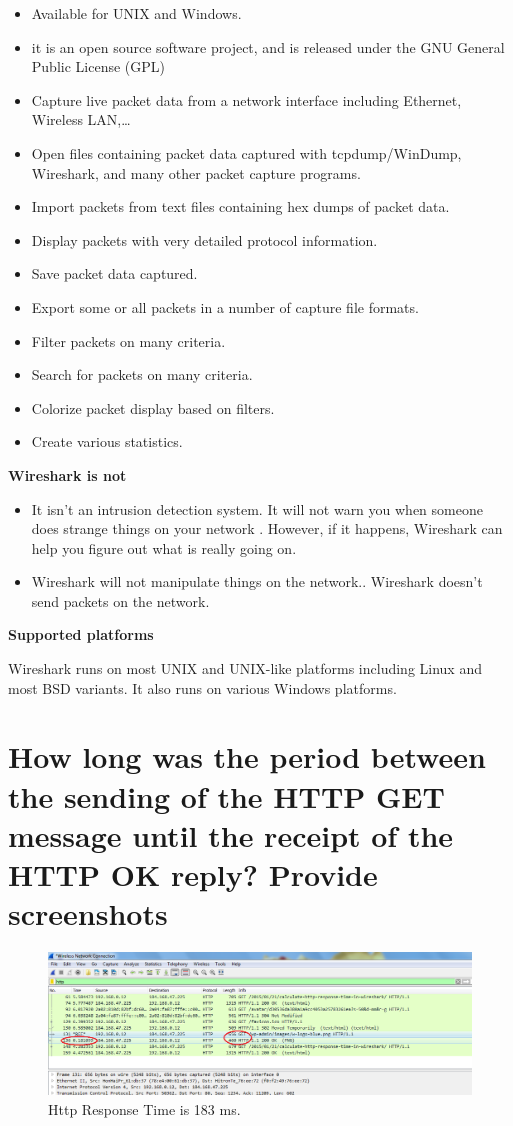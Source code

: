 \begin{itemize}
\item Available for UNIX and Windows.
\item it is an open source software project, and is released under the GNU General Public License (GPL)
\item Capture live packet data from a network interface including Ethernet, Wireless LAN,…
\item Open files containing packet data captured with tcpdump/WinDump, Wireshark, and many other packet capture programs.
\item Import packets from text files containing hex dumps of packet data.
\item Display packets with very detailed protocol information.
\item Save packet data captured.
\item Export some or all packets in a number of capture file formats.
\item Filter packets on many criteria.
\item Search for packets on many criteria.
\item Colorize packet display based on filters.
\item Create various statistics.
\end{itemize}
\textbf{Wireshark is not}
\begin{itemize}
\item It  isn’t an intrusion detection system. It will not warn you when someone does strange things on your network . However, if it happens, Wireshark can help you figure out what is really going on.
\item Wireshark will not manipulate things on the network..  Wireshark doesn’t send packets on the network.
\end{itemize}

\textbf{Supported platforms}

Wireshark runs on most UNIX and UNIX-like platforms including Linux and most BSD variants. It also runs on various Windows platforms.

\clearpage
\section{ How long was the period between the sending of the HTTP GET message until the
receipt of the HTTP OK reply? Provide screenshots}


\begin{figure}[H]
\centering
  \includegraphics[width=.9\textwidth]{Images/Task1_1.png}
  \caption{Http Response Time is 183 ms.}
  \label{fig:1.1}
\end{figure}

